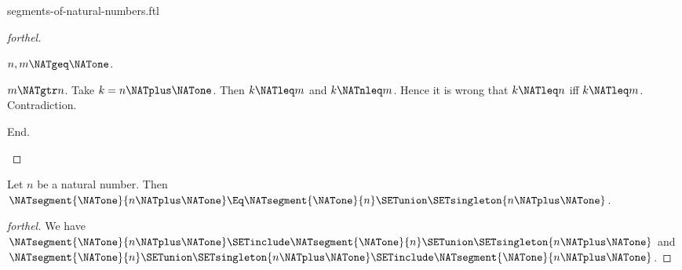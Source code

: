 \documentclass{stex}
\begin{document}
\begin{smodule}{segments-of-natural-numbers.ftl}
\begin{proof}[forthel]
\begin{case}{$n, m \NATgeq \NATone$.}
      \begin{case}{$m \NATgtr n$.}
        Take $k = n \NATplus \NATone$.
        Then $k \NATleq m$ and $k \NATnleq m$.
        Hence it is wrong that $k \NATleq n$ iff $k \NATleq m$.
        Contradiction.
      \end{case}
    End.
  \end{case}
\end{proof}

\begin{proposition}[forthel,id=FOUNDATIONS_14_658708738605056]
  Let $n$ be a natural number.
  Then $\NATsegment{\NATone}{n \NATplus \NATone} \Eq \NATsegment{\NATone}{n} \SETunion \SETsingleton{n \NATplus \NATone}$.
\end{proposition}
\begin{proof}[forthel]
  We have
  $\NATsegment{\NATone}{n \NATplus \NATone} \SETinclude \NATsegment{\NATone}{n} \SETunion \SETsingleton{n \NATplus \NATone}$ and $\NATsegment{\NATone}{n} \SETunion \SETsingleton{n \NATplus \NATone} \SETinclude \NATsegment{\NATone}{n \NATplus \NATone}$.
\end{proof}
\end{smodule}
\end{document}
